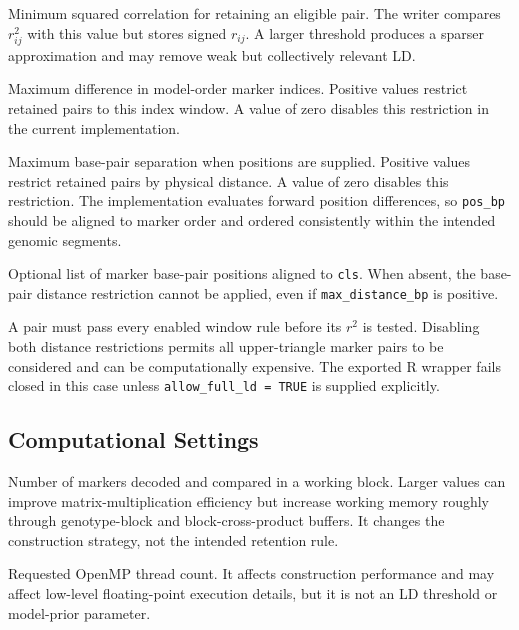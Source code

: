 \documentclass[
  11pt,
  letterpaper,
  DIV=11,
  numbers=noendperiod]{scrartcl}
\providecommand{\tightlist}{%
  \setlength{\itemsep}{0pt}\setlength{\parskip}{0pt}}
\begin{document}
\begin{description}
\tightlist
\item[\texttt{r2\_threshold}]
Minimum squared correlation for retaining an eligible pair. The writer
compares \(r_{ij}^2\) with this value but stores signed \(r_{ij}\). A
larger threshold produces a sparser approximation and may remove weak
but collectively relevant LD.
\item[\texttt{max\_distance\_variants}]
Maximum difference in model-order marker indices. Positive values
restrict retained pairs to this index window. A value of zero disables
this restriction in the current implementation.
\item[\texttt{max\_distance\_bp}]
Maximum base-pair separation when positions are supplied. Positive
values restrict retained pairs by physical distance. A value of zero
disables this restriction. The implementation evaluates forward position
differences, so \texttt{pos\_bp} should be aligned to marker order and
ordered consistently within the intended genomic segments.
\item[\texttt{pos\_bp}]
Optional list of marker base-pair positions aligned to \texttt{cls}.
When absent, the base-pair distance restriction cannot be applied, even
if \texttt{max\_distance\_bp} is positive.
\end{description}

A pair must pass every enabled window rule before its \(r^2\) is tested.
Disabling both distance restrictions permits all upper-triangle marker
pairs to be considered and can be computationally expensive. The
exported R wrapper fails closed in this case unless
\texttt{allow\_full\_ld\ =\ TRUE} is supplied explicitly.

\subsection{Computational Settings}\label{computational-settings}

\begin{description}
\tightlist
\item[\texttt{block\_size}]
Number of markers decoded and compared in a working block. Larger values
can improve matrix-multiplication efficiency but increase working memory
roughly through genotype-block and block-cross-product buffers. It
changes the construction strategy, not the intended retention rule.
\item[\texttt{nthreads}]
Requested OpenMP thread count. It affects construction performance and
may affect low-level floating-point execution details, but it is not an
LD threshold or model-prior parameter.
\end{description}
\end{document}
